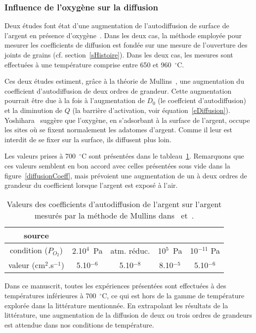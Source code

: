 		\subsubsection{Influence de l'oxygène sur la diffusion}
Deux études font état d'une augmentation de l'autodiffusion de surface de l'argent en présence d'oxygène~\cite{rhead1965surface, yoshihara1979effect}. Dans les deux cas, la méthode employée pour mesurer les coefficients de diffusion est fondée sur une mesure de l'ouverture des joints de grains (cf. section~\ref{sHistoire}). Dans les deux cas, les mesures sont effectuées à une température comprise entre 650 et 960~$^\circ$C.\par 
Ces deux études estiment, grâce à la théorie de Mullins~\cite{mullins1957theory}, une augmentation du coefficient d'autodiffusion de deux ordres de grandeur. Cette augmentation pourrait être due à la fois à l'augmentation de $D_0$ (le coeffcient d'autodiffusion) et la diminution de $Q$ (la barrière d'activation, voir équation~\ref{eDiffusion}). Yoshihara~\cite{yoshihara1979effect} suggère que l'oxygène, en s'adsorbant à la surface de l'argent, occupe les sites où se fixent normalement les adatomes d'argent. Comme il leur est interdit de se fixer sur la surface, ils diffusent plus loin.\par 
Les valeurs prises à 700~$^\circ$C sont présentées dans le tableau~\ref{tDiffusion}. Remarquons que ces valeurs semblent en bon accord avec celles présentées sous vide dans la figure~\ref{diffusionCoeff}, mais prévoient une augmentation de un à deux ordres de grandeur du coefficient lorsque l'argent est exposé à l'air.\par 

\begin{table}
\centering
\begin{tabular}{ccccc}
\hline
source & \cite{rhead1963surface, rhead1965surface} & \cite{rhead1963surface, rhead1965surface} &\cite{yoshihara1979effect} & \cite{yoshihara1979effect}\\
\hline
condition ($P_{O_{2}}$) & 2.10$^4$~Pa & atm. réduc. & 10$^5$~Pa & 10$^{-11}$ Pa \\
valeur (cm$^2$.s$^{-1}$) & 5.10$^{-6}$ & 5.10$^{-8}$ & 8.10$^{-5}$ & 5.10$^{-6}$\\
\hline
\end{tabular}
\caption{Valeurs des coefficients d'autodiffusion de l'argent sur l'argent mesurés par la méthode de Mullins dans~\cite{rhead1963surface, rhead1965surface} et~\cite{yoshihara1979effect}.}
\label{tDiffusion}
\end{table}
Dans ce manuscrit, toutes les expériences présentées sont effectuées à des températures inférieures à 700~$^\circ$C, ce qui est hors de la gamme de température explorée dans la littérature mentionnée. En extrapolant les résultats de la littérature, une augmentation de la diffusion de deux ou trois ordres de grandeurs est attendue dans nos conditions de température.\par 

